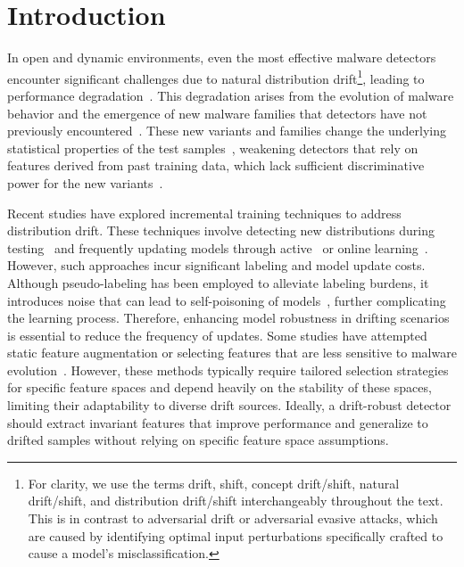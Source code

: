 \section{Introduction}
In open and dynamic environments, even the most effective malware detectors encounter significant challenges due to natural distribution drift{}\footnote{For clarity, we use the terms drift, shift, concept drift/shift, natural drift/shift, and distribution drift/shift interchangeably throughout the text. This is in contrast to adversarial drift or adversarial evasive attacks, which are caused by identifying optimal input perturbations specifically crafted to cause a model's misclassification.}, leading to performance degradation~\cite{transcending, cade}. This degradation arises from the evolution of malware behavior and the emergence of new malware families that detectors have not previously encountered~\cite{pei2024exploiting}. These new variants and families change the underlying statistical properties of the test samples~\cite{tesseract, overkill, transcending, Drift_forensice}, weakening detectors that rely on features derived from past training data, which lack sufficient discriminative power for the new variants~\cite{malware_evolution_update}.

Recent studies have explored incremental training techniques to address distribution drift. These techniques involve detecting new distributions during testing~\cite{transcending, cade} and frequently updating models through active~\cite{tesseract, continuous} or online learning~\cite{droidevolver, online_mal, labelless}. However, such approaches incur significant labeling and model update costs. Although pseudo-labeling has been employed to alleviate labeling burdens, it introduces noise that can lead to self-poisoning of models~\cite{labelless, recda}, further complicating the learning process. Therefore, enhancing model robustness in drifting scenarios is essential to reduce the frequency of updates. Some studies have attempted static feature augmentation or selecting features that are less sensitive to malware evolution~\cite{scrr, apigraph, overkill}. However, these methods typically require tailored selection strategies for specific feature spaces and depend heavily on the stability of these spaces, limiting their adaptability to diverse drift sources. Ideally, a drift-robust detector should extract invariant features that improve performance and generalize to drifted samples without relying on specific feature space assumptions.





